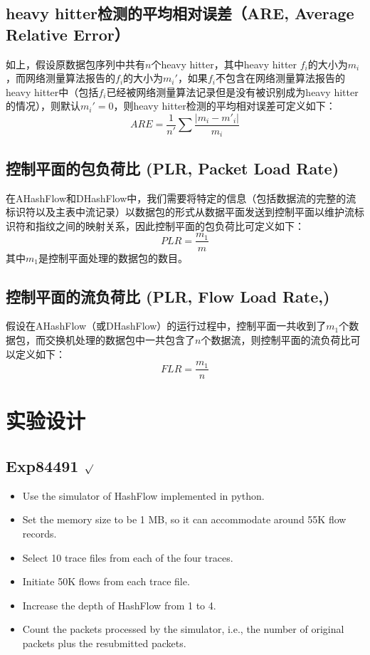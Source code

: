 \documentclass{article}
\begin{document}
\subsection{ heavy hitter检测的平均相对误差（ARE, Average Relative Error）}
如上，假设原数据包序列中共有$n$个heavy hitter，其中heavy hitter $f_i$的大小为$m_i$，而网络测量算法报告的$f_i$的大小为$m_i'$，如果$f_i$不包含在网络测量算法报告的heavy hitter中（包括$f_i$已经被网络测量算法记录但是没有被识别成为heavy hitter的情况），则默认$m_i'=0$，则heavy hitter检测的平均相对误差可定义如下：
$$
ARE = \frac{1}{n'}\sum\frac{|m_i - m'_i|}{m_i}
$$

\subsection{ 控制平面的包负荷比 (PLR, Packet Load Rate)}
在AHashFlow和DHashFlow中，我们需要将特定的信息（包括数据流的完整的流标识符以及主表中流记录）以数据包的形式从数据平面发送到控制平面以维护流标识符和指纹之间的映射关系，因此控制平面的包负荷比可定义如下：
$$
PLR = \frac{m_1}{m}
$$
其中$m_1$是控制平面处理的数据包的数目。

\subsection{控制平面的流负荷比 (PLR, Flow Load Rate,)}
假设在AHashFlow（或DHashFlow）的运行过程中，控制平面一共收到了$m_1$个数据包，而交换机处理的数据包中一共包含了$n$个数据流，则控制平面的流负荷比可以定义如下：
$$
FLR = \frac{m_1}{n}
$$

\section{实验设计}
\subsection{Exp84491 $\surd$}
\begin{itemize}
	\item Use the simulator of HashFlow implemented in python.
	\item Set the memory size to be 1 MB, so it can accommodate around 55K flow records.
	\item Select 10 trace files from each of the four traces.
	\item Initiate 50K flows from each trace file.
	\item Increase the depth of HashFlow from 1 to 4. 
	\item Count the packets processed by the simulator, i.e., the number of original packets plus the resubmitted packets.
\end{itemize}
\end{document}
